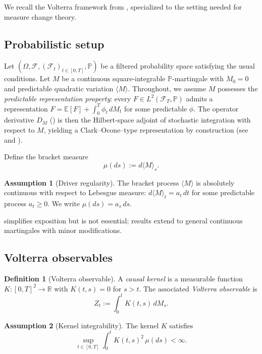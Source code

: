 \documentclass[11pt]{article}
\theoremstyle{plain}
\theoremstyle{definition}
\newtheorem{definition}{Definition}[section]
\newtheorem{assumption}{Assumption}[section]
\theoremstyle{remark}
\newcommand{\R}{\mathbb{R}}
\newcommand{\E}{\mathbb{E}}
\newcommand{\F}{\mathcal{F}}
\newcommand{\PP}{\mathbb{P}}
\newcommand{\bracket}[1]{\langle #1 \rangle}
\begin{document}
We recall the Volterra framework from \cite{Fontes2026f}, specialized to the
setting needed for measure change theory.

\subsection{Probabilistic setup}

Let $(\Omega, \F, (\F_t)_{t \in [0,T]}, \PP)$ be a filtered probability space
satisfying the usual conditions. Let $M$ be a continuous square-integrable
$\PP$-martingale with $M_0 = 0$ and predictable quadratic variation
$\bracket{M}$. Throughout, we assume $M$ possesses the \emph{predictable
representation property}: every $F \in L^2(\F_T, \PP)$ admits a representation
$F = \E[F] + \int_0^T \phi_t\,dM_t$ for some predictable $\phi$. The operator
derivative $D_M$ () is then the Hilbert-space adjoint of
stochastic integration with respect to $M$, yielding a Clark--Ocone--type
representation by construction (see  and
).

Define the bracket measure
\[
\mu(ds) := d\bracket{M}_s.
\]

\begin{assumption}[Driver regularity]\label{ass:driver}
The bracket process $\bracket{M}$ is absolutely continuous with respect to
Lebesgue measure: $d\bracket{M}_t = a_t\,dt$ for some predictable process
$a_t \ge 0$. We write $\mu(ds) = a_s\,ds$.
\end{assumption}

 simplifies exposition but is not essential; results extend
to general continuous martingales with minor modifications.

\subsection{Volterra observables}

\begin{definition}[Volterra observable]\label{def:volterra}
A \emph{causal kernel} is a measurable function $K : [0,T]^2 \to \R$ with
$K(t,s) = 0$ for $s > t$. The associated \emph{Volterra observable} is
\[
Z_t := \int_0^t K(t,s)\,dM_s.
\]
\end{definition}

\begin{assumption}[Kernel integrability]\label{ass:kernel}
The kernel $K$ satisfies
\[
\sup_{t \in [0,T]} \int_0^t K(t,s)^2\,\mu(ds) < \infty.
\]
\end{assumption}
\end{document}
